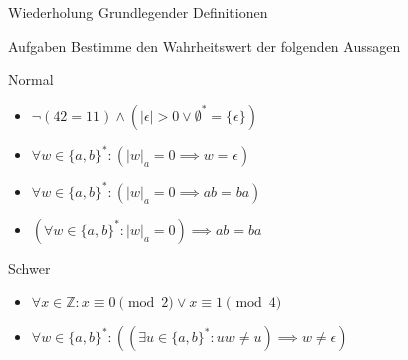 {
\begin{frame}[fragile]{Wiederholung Grundlegender Definitionen}
    \begin{alertblock}{Aufgaben}
    Bestimme den Wahrheitswert der folgenden Aussagen
    \end{alertblock}
    \begin{block}{Normal}
    \begin{itemize}
        \item $\neg (42 = 11) \wedge (|\epsilon| > 0 \vee \emptyset^* = \{\epsilon\})$
        \item $\forall w \in \{a, b\}^*: (|w|_a = 0 \implies w = \epsilon)$
        \item $\forall w \in \{a, b\}^*: (|w|_a = 0 \implies ab = ba)$
        \item $(\forall w \in \{a, b\}^*: |w|_a = 0) \implies ab = ba$
    \end{itemize}
    \end{block}
    \begin{block}{Schwer}
    \begin{itemize}
        \item $\forall x \in \mathbb{Z}: x \equiv 0 \pmod{2} \vee x \equiv 1 \pmod{4}$ 
        \item $\forall w \in \{a, b\}^*: \left(\left(\exists u \in \{a,b\}^*: uw \neq u\right) \implies w \neq \epsilon\right)$ 
    \end{itemize}
    \end{block}
\end{frame}
}


